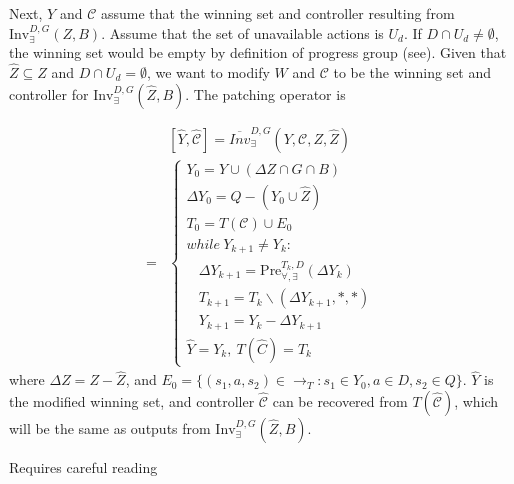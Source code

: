 Next, $ Y $ and $ \mathcal{C} $ assume that  the winning set and controller resulting from $ \text{Inv}_{\exists}^{D,G}(Z,B) $. Assume that the set of unavailable actions is $ U_d $. If $ D\cap U_d \not= \emptyset$, the winning set would be empty by definition of progress group (see\cite{Nilsson2017}). Given that $ \widehat{Z} \subseteq Z $ and $ D\cap U_d=\emptyset $, we want to modify $ W $ and $ \mathcal{C} $ to be the winning set and controller for $ \text{Inv}_{\exists}^{D,G}(\widehat{Z}, B) $. The patching operator is

\begin{align}
&[\widehat{Y},\widehat{\mathcal{C}}]=\overline{Inv}_{\exists}^{D,G}(Y,\mathcal{C},Z,\widehat{Z}) \\
=&\begin{cases}
Y_0 = Y\cup (\Delta Z\cap G \cap B)\\
\Delta Y_0 = Q - (Y_0 \cup \widehat{Z})\\
T_0  = T(\mathcal{C})\cup E_0\\
while \ Y_{k+1}\not= Y_k:\\
\ \ \ \ \Delta Y_{k+1} = \text{Pre}_{\forall,\exists}^{T_k,D}(\Delta Y_k) \\
\ \ \ \ T_{k+1} = T_{k}\backslash (\Delta Y_{k+1},*,*)\\
\ \ \ \ Y_{k+1} = Y_k- \Delta Y_{k+1}\\
\widehat{Y}=Y_k,\ T(\widehat{C}) = T_{k}
\end{cases}\label{patch_inv}
\end{align}
where $ \Delta Z = Z - \widehat{Z} $, and $ E_0 = \{(s_1,a,s_2)\in \rightarrow_{T}: s_1\in Y_0, a\in D, s_2 \in Q\} $. $ \widehat{Y} $ is the modified winning set, and controller $ \widehat{\mathcal{C}} $ can be recovered from $ T(\widehat{\mathcal{C}}) $, which will be the same as outputs from $ \text{Inv}_{\exists}^{D,G}(\widehat{Z},B) $.

{\color{red} Requires careful reading}

